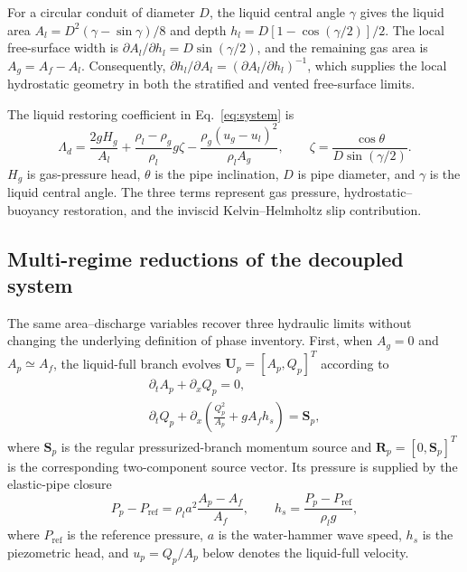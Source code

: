 For a circular conduit of diameter $D$, the liquid central angle $\gamma$
gives the liquid area $A_l=D^2(\gamma-\sin\gamma)/8$ and depth
$h_l=D[1-\cos(\gamma/2)]/2$. The local free-surface width is
$\partial A_l/\partial h_l=D\sin(\gamma/2)$, and the remaining gas area is
$A_g=A_f-A_l$. Consequently,
$\partial h_l/\partial A_l=(\partial A_l/\partial h_l)^{-1}$, which supplies
the local hydrostatic geometry in both the stratified and vented
free-surface limits.

The liquid restoring coefficient in Eq.~\eqref{eq:system} is
\begin{equation}
\Lambda_d
=\frac{2gH_g}{A_l}
+\frac{\rho_l-\rho_g}{\rho_l}g\zeta
-\frac{\rho_g(u_g-u_l)^2}{\rho_lA_g},
\qquad
\zeta=\frac{\cos\theta}{D\sin(\gamma/2)}.
\label{eq:restoring_coefficient}
\end{equation}
$H_g$ is gas-pressure head, $\theta$ is the pipe inclination, $D$ is pipe
diameter, and $\gamma$ is the liquid central angle. The three terms represent
gas pressure, hydrostatic--buoyancy restoration, and the inviscid
Kelvin--Helmholtz slip contribution.

\subsection{Multi-regime reductions of the decoupled system}

The same area--discharge variables recover three hydraulic limits without
changing the underlying definition of phase inventory. First, when $A_g=0$ and
$A_p\simeq A_f$, the liquid-full branch evolves
$\mathbf U_p=[A_p,Q_p]^{T}$ according to
\begin{equation}
\begin{gathered}
\partial_tA_p+\partial_xQ_p=0,\\[3pt]
\partial_tQ_p+
\partial_x\!\left(\frac{Q_p^2}{A_p}+gA_fh_s\right)=\mathbf S_p,
\end{gathered}
\label{eq:liquid_full_branch}
\end{equation}
where $\mathbf S_p$ is the regular pressurized-branch momentum source and
$\mathbf R_p=[0,\mathbf S_p]^{T}$ is the corresponding two-component
source vector. Its pressure is supplied by the elastic-pipe closure
\begin{equation}
P_p-P_{\mathrm{ref}}
=\rho_la^2\frac{A_p-A_f}{A_f},
\qquad
h_s=\frac{P_p-P_{\mathrm{ref}}}{\rho_lg},
\label{eq:elastic}
\end{equation}
where $P_{\mathrm{ref}}$ is the reference pressure, $a$ is the water-hammer
wave speed, $h_s$ is the piezometric head, and $u_p=Q_p/A_p$ below denotes the
liquid-full velocity.

